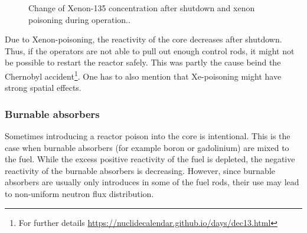 \begin{figure}[ht!]
\protect {}\protect
\caption{\label{fig:xenonpois} \footnotesize{Change of Xenon-135 concentration after shutdown and xenon poisoning during operation..}}
\end{figure}

Due to Xenon-poisoning, the reactivity of the core decreases after shutdown. Thus, if the operators are not able to pull out enough control rods, it might not be possible to restart the reactor safely. This was partly the cause beind the Chernobyl accident\footnote{For further details \url{https://nuclidecalendar.github.io/days/dec13.html}}. One has to also mention that Xe-poisoning might have strong spatial effects. 

\subsubsection{Burnable absorbers}

Sometimes introducing a reactor poison into the core is intentional. This is the case when burnable absorbers (for example boron or gadolinium) are mixed to the fuel. While the excess positive reactivity of the fuel is depleted, the negative reactivity of the burnable absorbers is decreasing. However, since burnable absorbers are usually only introduces in some of the fuel rods, their use may lead to non-uniform neutron flux distribution.

%